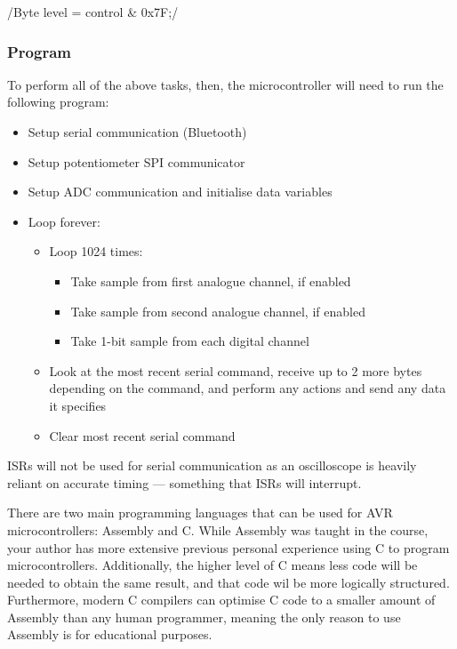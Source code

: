 /Byte level = control & 0x7F;/


\subsubsection{Program}
To perform all of the above tasks, then, the microcontroller will need to run
the following program:

\begin{itemize}
  \item Setup serial communication (Bluetooth)
  \item Setup potentiometer SPI communicator
  \item Setup ADC communication and initialise data variables
  \item Loop forever:
    \begin{itemize}
      \item Loop 1024 times:
        \begin{itemize}
          \item Take sample from first analogue channel, if enabled
          \item Take sample from second analogue channel, if enabled
          \item Take 1-bit sample from each digital channel
        \end{itemize}
      \item Look at the most recent serial command, receive up to 2 more bytes
        depending on the command, and perform any actions and send any data it
        specifies
      \item Clear most recent serial command
    \end{itemize}
\end{itemize}

ISRs will not be used for serial communication as an oscilloscope is heavily
reliant on accurate timing --- something that ISRs will interrupt.

There are two main programming languages that can be used for AVR
microcontrollers: Assembly and C. While Assembly was taught in the course, your
author has more extensive previous personal experience using C to program
microcontrollers. Additionally, the higher level of C means less code will be
needed to obtain the same result, and that code wil be more logically
structured. Furthermore, modern C compilers can optimise C code to a smaller
amount of Assembly than any human programmer, meaning the only reason to use
Assembly is for educational purposes.

